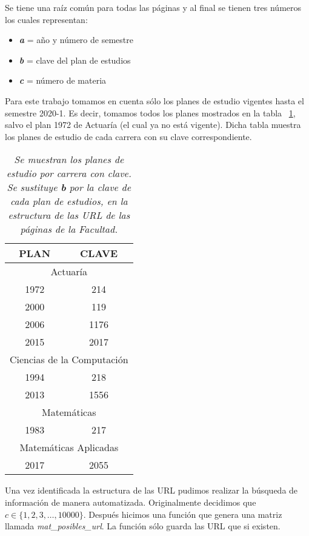 Se tiene una raíz común para todas las páginas y al final se tienen tres números los cuales representan:
  
  \begin{itemize}
\item[ ] \textit{\textbf{a}} = año y número de semestre

\item[ ] \textit{\textbf{b}} = clave del plan de estudios

\item[ ] \textit{\textbf{c}} = número de materia
\end{itemize}

Para este trabajo tomamos en cuenta sólo los planes de estudio vigentes hasta el semestre 2020-1. Es decir, tomamos todos los planes mostrados en la tabla \tablename{~\ref{PlanesEstudio}}, salvo el plan 1972 de Actuaría (el cual ya no está vigente). Dicha tabla muestra los planes de estudio de cada carrera con su clave correspondiente.

\begin{table}[h]
\centering
\begin{tabular}{|c|c|}
\hline 
\textbf{PLAN} & \textbf{CLAVE} \\ 
\hline 
\multicolumn{2}{|c|}{Actuaría} \\ 
\hline 
1972 & 214 \\ 
\hline 
2000 & 119 \\ 
\hline 
2006 & 1176 \\ 
\hline 
2015 & 2017 \\ 
\hline 
\multicolumn{2}{|c|}{Ciencias de la Computación} \\ 
\hline 
1994 & 218 \\ 
\hline 
2013 & 1556 \\ 
\hline 
\multicolumn{2}{|c|}{Matemáticas} \\ 
\hline 
1983 & 217 \\ 
\hline 
\multicolumn{2}{|c|}{Matemáticas Aplicadas} \\ 
\hline 
2017 & 2055 \\ 
\hline 
\end{tabular}
\caption[\textit{Planes de estudio por carrera con clave}]{\textit{Se muestran los planes de estudio por carrera con clave. Se sustituye \textbf{b} por la clave de cada plan de estudios, en la estructura de las URL de las páginas de la Facultad.}}\label{PlanesEstudio}
\end{table}

Una vez identificada la estructura de las URL pudimos realizar la búsqueda de información de manera automatizada. Originalmente decidimos que $c \in \{1,2,3, \ldots, 10 000\}$. Después hicimos una función que genera una matriz llamada \textit{mat\_posibles\_url}. La función sólo guarda las URL que si existen.


